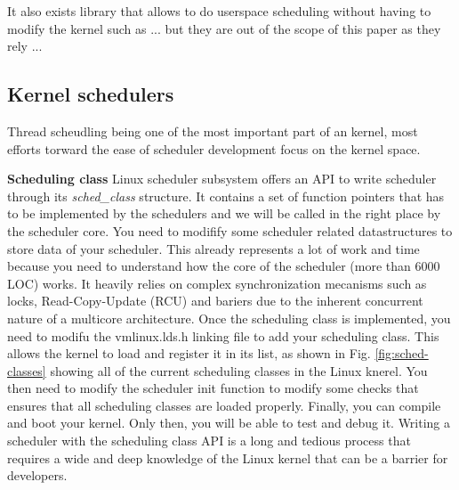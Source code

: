\par It also exists library that allows to do userspace scheduling without having to modify the kernel such as ... but they are out of the scope of this paper as they rely ...


\subsection{Kernel schedulers}

\par Thread scheudling being one of the most important part of an kernel, most efforts torward the ease of scheduler development focus on the kernel space.\newline

\textbf{Scheduling class} Linux scheduler subsystem offers an API to write scheduler through its \textit{sched\_class} structure. It contains a set of function pointers that has to be implemented by the schedulers and we will be called in the right place by the scheduler core. You need to modifify some scheduler related datastructures to store data of your scheduler. This already represents a lot of work and time because you need to understand how the core of the scheduler (more than 6000 LOC) works. It heavily relies on complex synchronization mecanisms such as locks, Read-Copy-Update (RCU) and bariers due to the inherent concurrent nature of a multicore architecture. Once the scheduling class is implemented, you need to modifu the vmlinux.lds.h linking file to add your scheduling class. This allows the kernel to load and register it in its list, as shown in Fig. \ref{fig:sched-classes} showing all of the current scheduling classes in the Linux knerel. You then need to modify the scheduler init function to modify some checks that ensures that all scheduling classes are loaded properly. Finally, you can compile and boot your kernel. Only then, you will be able to test and debug it. Writing a scheduler with the scheduling class API is a long and tedious process that requires a wide and deep knowledge of the Linux kernel that can be a barrier for developers.\newline
